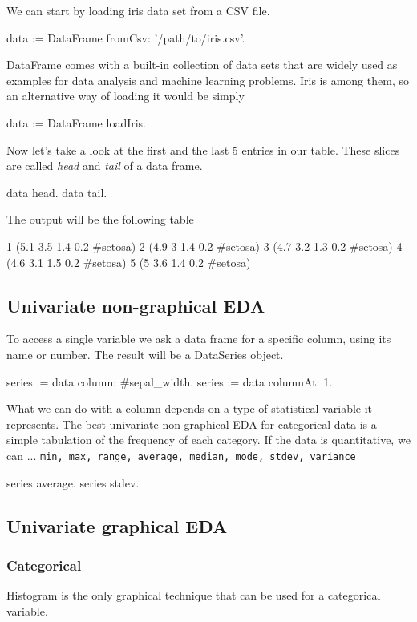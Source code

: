 \documentclass{article}
\begin{document}
\begin{multicols}{2}
We can start by loading iris data set from a CSV file.
\begin{code}{}
data := DataFrame fromCsv: '/path/to/iris.csv'.
\end{code}
DataFrame comes with a built-in collection of data sets that are widely used as examples for data analysis and machine learning problems. Iris is among them, so an alternative way of loading it would be simply
\begin{code}{}
data := DataFrame loadIris.
\end{code}
Now let's take a look at the first and the last 5 entries in our table. These slices are called \textit{head} and \textit{tail} of a data frame.
\begin{code}{}
data head.
data tail.
\end{code}
The output will be the following table
\begin{code}{}
1   (5.1 3.5 1.4 0.2 #setosa)
2	  (4.9 3 1.4 0.2 #setosa)
3	  (4.7 3.2 1.3 0.2 #setosa)
4	  (4.6 3.1 1.5 0.2 #setosa)
5	  (5 3.6 1.4 0.2 #setosa)
\end{code}

\subsection{Univariate non-graphical EDA}
To access a single variable we ask a data frame for a specific column, using its name or number. The result will be a DataSeries object.
\begin{code}{}
series := data column: #sepal_width.
series := data columnAt: 1.
\end{code}
What we can do with a column depends on a type of statistical variable it represents. The best univariate non-graphical EDA for categorical data is a simple tabulation of the frequency of each category\cite{Seltman}. If the data is quantitative, we can ...
\texttt{min, max, range, average, median, mode, stdev, variance}
\begin{code}{}
series average. 
series stdev.
\end{code}

\subsection{Univariate graphical EDA}
\subsubsection{Categorical}

Histogram is the only graphical technique that can be used for a categorical variable.


\end{multicols}
\end{document}
